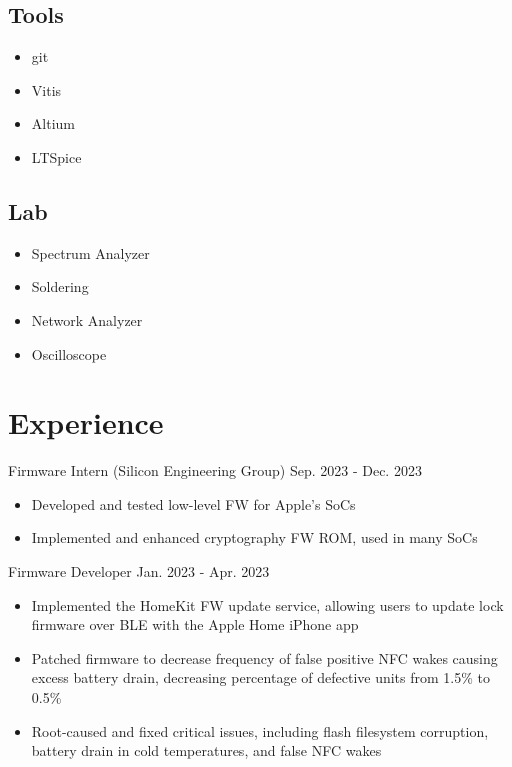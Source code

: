 \documentclass[lighthipster]{styles}
\begin{document}
\begin{paracol}{2}
{\subsection*{Tools}
\vspace{-0.4cm}
\begin{multicols}{2}
    \begin{itemize}
        \item git
        \item Vitis
        \item Altium
        \item LTSpice
    \end{itemize}
\end{multicols}

\subsection*{Lab}
\vspace{-0.4cm}
\begin{multicols}{2}[]
    \begin{itemize}
        \item Spectrum Analyzer
        \item Soldering
        \item Network Analyzer
        \item Oscilloscope
    \end{itemize}
\end{multicols}

}
\switchcolumn

\section*{Experience}

{Firmware Intern (Silicon Engineering Group)}
{Sep. 2023 - Dec. 2023}
\begin{itemize}
    \item Developed and tested low-level FW for Apple's SoCs
    \item Implemented and enhanced cryptography FW ROM, used in many SoCs
\end{itemize}

{Firmware Developer}
{Jan. 2023 - Apr. 2023}
\begin{itemize}
    \item Implemented the HomeKit FW update service, allowing users to update lock
          firmware over BLE with the Apple Home iPhone app
    \item Patched firmware to decrease frequency of false positive NFC wakes
          causing excess battery drain, decreasing percentage of defective
          units from 1.5\% to 0.5\%
    \item Root-caused and fixed critical issues, including flash filesystem
          corruption, battery drain in cold temperatures, and false NFC wakes
\end{itemize}


\end{paracol}
\end{document}
